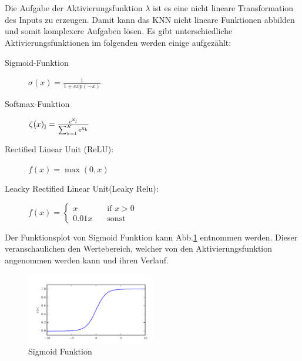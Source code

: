 \documentclass{llncs}
\begin{document}
\\\\
Die Aufgabe der Aktivierungsfunktion $\lambda$  ist es eine nicht lineare Transformation des Inputs zu erzeugen. Damit kann das KNN nicht lineare Funktionen abbilden und somit komplexere Aufgaben lösen. Es gibt unterschiedliche Aktivierungsfunktionen im folgenden werden einige aufgezählt:
\vspace{5 mm}
\begin{description}
	\item[Sigmoid-Funktion]		
	
	\begin{math}
	\sigma(x)=\frac{1}{1+exp(-x)}
	\end{math}
	\vspace{5 mm}
	\item[Softmax-Funktion]
	
	\begin{math}
	\zeta(x)\textsubscript{j} = \frac{e\textsuperscript{x\textsubscript{j}}}{\sum_{k=1}^{K}e\textsuperscript{x\textsubscript{k}}}
	\end{math}
	\vspace{5 mm}
	\item[Rectified Linear Unit (ReLU):]
	
	\begin{math}
	f(x)=\max(0,x) 
	\end{math}
	\vspace{5 mm}
	\item[Leacky Rectified Linear Unit(Leaky Relu):]
	
	\begin{math}
	f(x) = \begin{cases}
	x  	 & \quad \text{if } x > 0\\
	0.01x & \quad \text{sonst} 
	\end{cases}
	\end{math}
	\vspace{5 mm}
\end{description}
\vspace{5 mm}
Der Funktionsplot von Sigmoid Funktion kann Abb.\ref{fig:Bild3} entnommen werden. Dieser veranschaulichen den Wertebereich, welcher von den Aktivierungsfunktion angenommen werden kann und ihren Verlauf. 
\begin{figure}[htbp] 
	\centering
	\includegraphics[width=0.5\textwidth]{sigmoid.png}
	\caption{Sigmoid Funktion}
	\label{fig:Bild3}
\end{figure}
\end{document}
